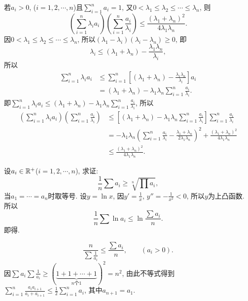 若$a_{i}>0$, ($i=1,2,\cdots,n$)且$\sum_{i=1}^{n}a_{i}=1$, 又$0<\lambda_{1}\le\lambda_{2}\le\cdots\le\lambda_{n}$,
则
\[
\left(\sum_{i=1}^{n}\lambda_{i}a_{i}\right)\left(\sum_{i=1}^{n}\frac{a_{i}}{\lambda_{i}}\right)\le\frac{\left(\lambda_{1}+\lambda_{n}\right)^{2}}{4\lambda_{1}\lambda_{n}}.
\]
\eq
\ba
因$0<\lambda_{1}\le\lambda_{2}\le\cdots\le\lambda_{n}$, 所以$\left(\lambda_{1}-\lambda_{i}\right)\left(\lambda_{i}-\lambda_{n}\right)\ge0$,
即
\[
\lambda_{i}\le\left(\lambda_{1}+\lambda_{n}\right)-\frac{\lambda_{1}\lambda_{n}}{\lambda_{i}},
\]
所以
\[
\begin{aligned}\sum_{i=1}^{n}\lambda_{i}a_{i} & \le\sum_{i=1}^{n}\left[\left(\lambda_{1}+\lambda_{n}\right)-\frac{\lambda_{1}\lambda_{n}}{\lambda_{i}}\right]a_{i}\\
 & =\left(\lambda_{1}+\lambda_{n}\right)-\lambda_{1}\lambda_{n}\sum_{i=1}^{n}\frac{a_{i}}{\lambda_{i}}.
\end{aligned}
\]
即$\sum_{i=1}^{n}\lambda_{i}a_{i}\le\left(\lambda_{1}+\lambda_{n}\right)-\lambda_{1}\lambda_{n}\sum_{i=1}^{n}\frac{a_{i}}{\lambda_{i}}$,
所以
\[
\begin{aligned}\left(\sum_{i=1}^{n}\lambda_{i}a_{i}\right)\left(\sum_{i=1}^{n}\frac{a_{i}}{\lambda_{i}}\right) & \le\left[\left(\lambda_{1}+\lambda_{n}\right)-\lambda_{1}\lambda_{n}\sum_{i=1}^{n}\frac{a_{i}}{\lambda_{i}}\right]\sum_{i=1}^{n}\frac{a_{i}}{\lambda_{i}}\\
 & =-\lambda_{1}\lambda_{n}\left(\sum_{i=1}^{n}\frac{a_{i}}{\lambda_{i}}-\frac{\lambda_{1}+\lambda_{n}}{2\lambda_{1}\lambda_{n}}\right)^{2}+\frac{\left(\lambda_{1}+\lambda_{n}\right)^{2}}{4\lambda_{1}\lambda_{n}}\\
 & \le\frac{\left(\lambda_{1}+\lambda_{n}\right)^{2}}{4\lambda_{1}\lambda_{n}}.
\end{aligned}
\]
\ea

设$a_{i}\in\mathbb{R}^{+}$($i=1,2,\cdots,n$), 求证:
\[
\frac{1}{n}\sum a_{i}\ge\sqrt[n]{\prod a_{i}},
\]
当$a_{1}=\cdots=a_{n}$时取等号.
\eq
\ba
设$y=\ln x$, 因$y'=\frac{1}{x}$, $y''=-\frac{1}{x^{2}}<0$, 所以$y$为上凸函数.
所以
\[
\frac{1}{n}\sum\ln a_{i}\le\ln\frac{\sum a_{i}}{n}.
\]
即得.
\ea

\[
\frac{n}{\sum\frac{1}{a_{i}}}\le\frac{\sum a_{i}}{n},\qquad\left(a_{i}>0\right).
\]
\eq
\ba
因$\sum a_{i}\sum\frac{1}{a_{i}}\ge\left(\underbrace{1+1+\cdots+1}_{n\text{个}1}\right)^{2}=n^{2}$,
由此不等式得到$\sum_{i=1}^{n}\frac{a_{i}a_{i+1}}{a_{i}+a_{i+1}}\le\frac{1}{2}\sum_{i=1}^{n}a_{i}$,
其中$a_{n+1}=a_{1}$.
\ea

